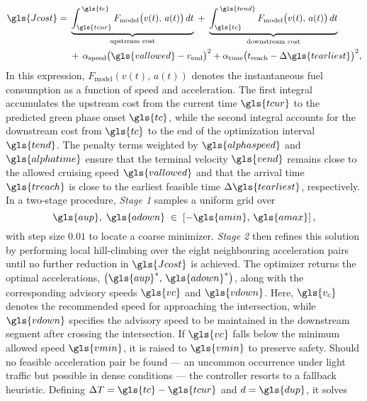 \begin{equation}
\begin{aligned}
    \gls{Jcost} =\;
    &\underbrace{\int_{\gls{tcur}}^{\,\gls{tc}} F_{\mathrm{model}}\bigl(v(t),\,a(t)\bigr)\,dt}_{\text{upstream cost}}
    \;+\;
    \underbrace{\int_{\gls{tc}}^{\,\gls{tend}} F_{\mathrm{model}}\bigl(v(t),\,a(t)\bigr)\,dt}_{\text{downstream cost}} \\
    &+\, \alpha_{\mathrm{speed}}\bigl(\gls{vallowed} - v_{\mathrm{end}}\bigr)^2
    + \alpha_{\mathrm{time}}\bigl(t_{\mathrm{reach}} - \Delta \gls{tearliest}\bigr)^2,
\end{aligned}
\label{eq:costJ_highlevel}
\end{equation}
In this expression, $F_{\mathrm{model}}(v(t),\,a(t))$ denotes the instantaneous fuel consumption as a function of speed and acceleration. The first integral accumulates the upstream cost from the current time $\gls{tcur}$ to the predicted green phase onset $\gls{tc}$, while the second integral accounts for the downstream cost from $\gls{tc}$ to the end of the optimization interval $\gls{tend}$. The penalty terms weighted by $\gls{alphaspeed}$ and $\gls{alphatime}$ ensure that the terminal velocity $\gls{vend}$ remains close to the allowed cruising speed $\gls{vallowed}$ and that the arrival time $\gls{treach}$ is close to the earliest feasible time $\Delta\gls{tearliest}$, respectively.
\mynewline
In a two‐stage procedure, \textit{Stage 1} samples a uniform grid over
\begin{equation}
    \gls{aup},\;\gls{adown} \;\in\; \left[-\gls{amin},\,\gls{amax}\right],
\end{equation}
with step size $0.01$ to locate a coarse minimizer. \textit{Stage 2} then refines this solution by performing local hill‐climbing over the eight neighbouring acceleration pairs until no further reduction in $\gls{Jcost}$ is achieved. The optimizer returns the optimal accelerations, $\left(\gls{aup}^*,\,\gls{adown}^*\right)$, along with the corresponding advisory speeds $\gls{vc}$ and $\gls{vdown}$. Here, $\gls{v_c}$ denotes the recommended speed for approaching the intersection, while $\gls{vdown}$ specifies the advisory speed to be maintained in the downstream segment after crossing the intersection. If $\gls{vc}$ falls below the minimum allowed speed $\gls{vmin}$, it is raised to $\gls{vmin}$ to preserve safety.
\mynewline
Should no feasible acceleration pair be found --- an uncommon occurrence under light traffic but possible in dense conditions --- the controller resorts to a fallback heuristic. Defining $\Delta T = \gls{tc} - \gls{tcur}$ and $d = \gls{dup}$, it solves
